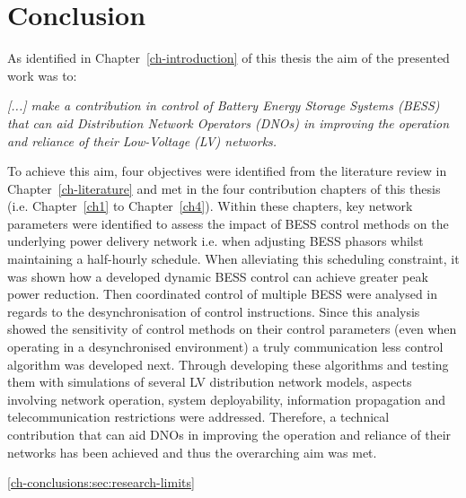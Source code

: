 \section{Conclusion}
\label{ch-conclusions:sec:conclusion}

As identified in Chapter~\ref{ch-introduction} of this thesis the aim of the presented work was to:

\textit{[...] make a contribution in control of Battery Energy Storage Systems (BESS) that can aid Distribution Network Operators (DNOs) in improving the operation and reliance of their Low-Voltage (LV) networks.}

To achieve this aim, four objectives were identified from the literature review in Chapter~\ref{ch-literature} and met in the four contribution chapters of this thesis (i.e. Chapter~\ref{ch1} to Chapter~\ref{ch4}).
Within these chapters, key network parameters were identified to assess the impact of BESS control methods on the underlying power delivery network i.e. when adjusting BESS phasors whilst maintaining a half-hourly schedule.
When alleviating this scheduling constraint, it was shown how a developed dynamic BESS control can achieve greater peak power reduction.
Then coordinated control of multiple BESS were analysed in regards to the desynchronisation of control instructions.
Since this analysis showed the sensitivity of control methods on their control parameters (even when operating in a desynchronised environment) a truly communication less control algorithm was developed next.
Through developing these algorithms and testing them with simulations of several LV distribution network models, aspects involving network operation, system deployability, information propagation and telecommunication restrictions were addressed.
Therefore, a technical contribution that can aid DNOs in improving the operation and reliance of their networks has been achieved and thus the overarching aim was met.

\ref{ch-conclusions:sec:research-limits}

